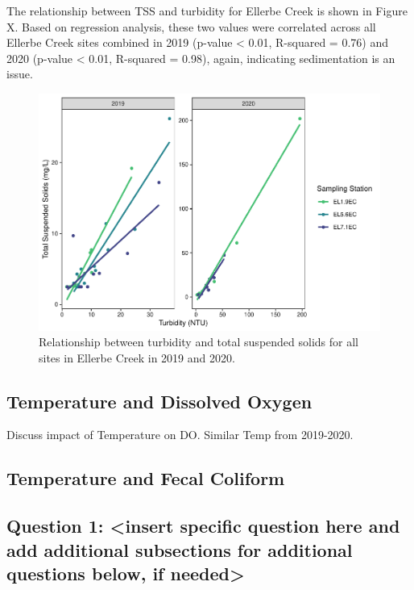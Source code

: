 \documentclass[
  12pt,
]{article}
\begin{document}
The relationship between TSS and turbidity for Ellerbe Creek is shown in
Figure X. Based on regression analysis, these two values were correlated
across all Ellerbe Creek sites combined in 2019 (p-value \textless{}
0.01, R-squared = 0.76) and 2020 (p-value \textless{} 0.01, R-squared =
0.98), again, indicating sedimentation is an issue.

\begin{figure}
\centering
\includegraphics{August_Lindborg_ENV872_Project_files/figure-latex/unnamed-chunk-23-1.pdf}
\caption{Relationship between turbidity and total suspended solids for
all sites in Ellerbe Creek in 2019 and 2020.}
\end{figure}

\hypertarget{temperature-and-dissolved-oxygen}{%
\subsection{Temperature and Dissolved
Oxygen}\label{temperature-and-dissolved-oxygen}}

Discuss impact of Temperature on DO. Similar Temp from 2019-2020.

\hypertarget{temperature-and-fecal-coliform}{%
\subsection{Temperature and Fecal
Coliform}\label{temperature-and-fecal-coliform}}

\hypertarget{question-1-insert-specific-question-here-and-add-additional-subsections-for-additional-questions-below-if-needed}{%
\subsection{Question 1: \textless insert specific question here and add
additional subsections for additional questions below, if
needed\textgreater{}}\label{question-1-insert-specific-question-here-and-add-additional-subsections-for-additional-questions-below-if-needed}}
\end{document}
